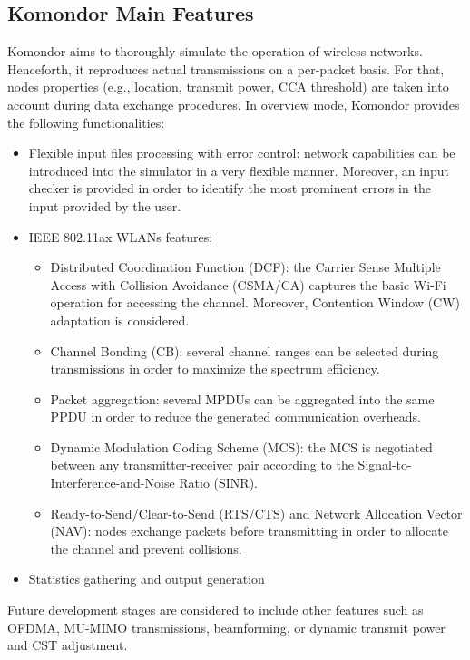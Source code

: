 \documentclass[a4paper]{article}
\begin{document}
	\subsection{Komondor Main Features}
	\label{section:features}
	Komondor aims to thoroughly simulate the operation of wireless networks. Henceforth, it reproduces actual transmissions on a per-packet basis. For that, nodes properties (e.g., location, transmit power, CCA threshold) are taken into account during data exchange procedures. In overview mode, Komondor provides the following functionalities:
	\begin{itemize}
		\item Flexible input files processing with error control: network capabilities can be introduced into the simulator in a very flexible manner. Moreover, an input checker is provided in order to identify the most prominent errors in the input provided by the user.
		\item IEEE 802.11ax WLANs features:
		\begin{itemize}
			\item Distributed Coordination Function (DCF): the Carrier Sense Multiple Access with Collision Avoidance (CSMA/CA) captures the basic Wi-Fi operation for accessing the channel. Moreover, Contention Window (CW) adaptation is considered.
			\item Channel Bonding (CB): several channel ranges can be selected during transmissions in order to maximize the spectrum efficiency.
			\item Packet aggregation: several MPDUs can be aggregated into the same PPDU in order to reduce the generated communication overheads.
			\item Dynamic Modulation Coding Scheme (MCS): the MCS is negotiated between any transmitter-receiver pair according to the Signal-to-Interference-and-Noise Ratio (SINR).
			\item Ready-to-Send/Clear-to-Send (RTS/CTS) and Network Allocation Vector (NAV): nodes exchange packets before transmitting in order to allocate the channel and prevent collisions.
		\end{itemize}
		\item Statistics gathering and output generation
	\end{itemize}

	Future development stages are considered to include other features such as OFDMA, MU-MIMO transmissions, beamforming, or dynamic transmit power and CST adjustment.
	
\end{document}
